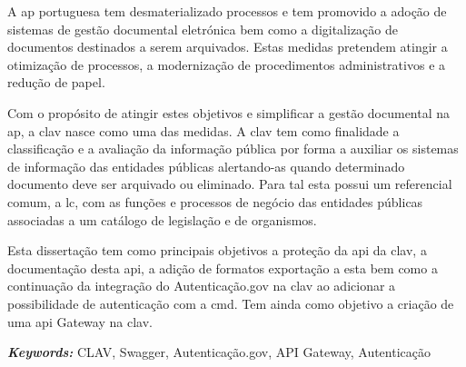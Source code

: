 A \acrlong{ap} portuguesa tem desmaterializado processos e tem promovido a adoção de sistemas de gestão documental eletrónica bem como a digitalização de documentos destinados a serem arquivados. Estas medidas pretendem atingir a otimização de processos, a modernização de procedimentos administrativos e a redução de papel.

Com o propósito de atingir estes objetivos e simplificar a gestão documental na \acrlong{ap}, a \acrfull{clav} nasce como uma das medidas. A \acrshort{clav} tem como finalidade a classificação e a avaliação da informação pública por forma a auxiliar os sistemas de informação das entidades públicas alertando-as quando determinado documento deve ser arquivado ou eliminado. Para tal esta possui um referencial comum, a \acrlong{lc}, com as funções e processos de negócio das entidades públicas associadas a um catálogo de legislação e de organismos.

Esta dissertação tem como principais objetivos a proteção da \acrshort{api} da \acrshort{clav}, a documentação desta \acrshort{api}, a adição de formatos exportação a esta bem como a continuação da integração do Autenticação.gov na \acrshort{clav} ao adicionar a possibilidade de autenticação com a \acrlong{cmd}. Tem ainda como objetivo a criação de uma \acrshort{api} Gateway na \acrshort{clav}.

\vspace{1cm}

\textit{\textbf{Keywords:}} CLAV, Swagger, Autenticação.gov, API Gateway, Autenticação
